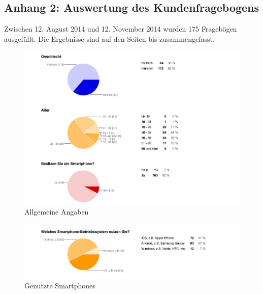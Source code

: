\newpage
\subsection*{Anhang 2: Auswertung des Kundenfragebogens}

Zwischen 12. August 2014 und 12. November 2014 wurden 175 Fragebögen ausgefüllt. Die Ergebnisse sind auf den Seiten \pageref{pic:aus1} bis \pageref{pic:aus4b} zusammengefasst.

\begin{figure}[H]
\begin{center}
\includegraphics[width=\textwidth]{u01.jpg}
\caption{Allgemeine Angaben}
\label{pic:aus1}
\end{center}
\end{figure}

\begin{figure}[H]
\begin{center}
\includegraphics[width=\textwidth]{u05.jpg}
\caption{Genutzte Smartphones}
\label{pic:aus5}
\end{center}
\end{figure}

